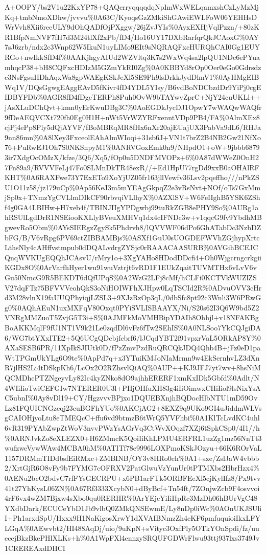\documentclass[]{article}
\begin{document}
A+OOPY/bs2V1u22KxYP78+QAQcrryqqqqdqNpImWxWELqamxshCzLyMzMjKq+tmbNmoXDhw/jvvvu\%0A63C/KyoqsGzZMkiShGAwiEWLFoW06YEHHsDWrVvh8Xii6reeULY9dOhQADfOjPXggw/26jZvJYIs\%0AyxEXHjVqlPzzn/+80zKR1BfpNmNVF7fH7d3M24tlXf2xPb/fD4/Ho16UY17DXbRarfqrQkJCAoxG\%0AY7sJ6zrb/ndx2c3Wnp62W5IkuN1uyLIMo9EIt9sNQRAQFxcHURQhCAI0Gg1EUYRGo+nwIkkSfD4f\%0AAKjhgyAIUd2WZVltq3K7s2WxWq4sa2lpQU1NDc6ePYuamhqcP38+bH8CQFxcHDIzM5GZmYkRI0Zg\%0A0KBBYd8rOp0Oer0eGo0Gdrsdzc3NsFgsuHDhAqxWa8gpWAEgKSkJeXl5SE9Ph9lsDrkkJydDlmV1\%0AyHMgEIBWq1V/DQsGgwgEAggEAvD5fKivr4fD4YDL5YIsy/B6vdBoNDCbzdDr9YiPj0cgEIDBYFDb\%0AGR8fD4fDgcTERPh8Puh0OvW9bTAYwvZprC+NjY24cuUKLl++jAsXLuDChQvt+kmn0yErKwuDBg3C\%0AoEGDkJycDJ1OpwY7wWAQwWAQfr9fDeAEQVCXt720fh0Eg0H1H+nWt5VrWZYRFxenntVDp9PB4/FA\%0AlmXEx8cjPj4ePp8Ply5dQjAYVF/fBoMBRqMR8fHx6nXr20ajEUajUX3PabVa9dL6/RHJa9nn86mn\%0A8lXey3FxceolEAhAlmWIoqi+31sb6J+VN1t7brZ2B4NB2Gw21NfXo76+PuRwEJ1Oh7S0NKSnpyM1\%0ANRVGoxEmk0n9/NHpdO1+oW+9jbbb68793ir7XdgOcOMzX/kfze/3Q6/Xq5/fOp0u5DNDFMVOPz+6\%0A87dWWeZ0OnH27Fn89a9/RVVVFeLj47Fo0SLMnDkTR48exR//+Ed1HpU77rgDd9xxB0aOHAlRFKHT\%0A6RAXFwe73Y7ExETo9XoYjUZ05fr163jllVewfv36Lsv2pqeffho///nPkZSU1O11z58/jz179uCp\%0Ap56KeJ3m5mYEAgGkpqZ2e3vRsNvt+NOf/oTs7GxMmjSp0x+TNmzYgCVLlmDIkCF90rbvqiVLlhyX\%0AZXlSV+W6FeIIghB5YSK6ZShf4g0GA4LBIHw+H7xeb4f/TBINJIIgYPDgwbj99tuRkZGB8ePHY9So\%0AURg1ahRSUlLgdDrR1NSEiooKXLlyBVeuXMHVq1dx4cIFNDc3w+v1qqcG9fv9YbdhMBgwevRo5Obm\%0AYsSIERgzZgySk5Phdrvh8/lQVVWF06dPo6GhATabDc3NzbDZbFG/B/V6vRpg6PV69ctZIBBAMBjs\%0ASXf1GuU0sUOGDEFWVhZGjhypXrtcLthsNly4cAHffvstmpub0dDQALvdrgZYSjc0rRAAACAASURB\%0AVGihBCEJCQnqWVKUgEQQhJCAsvU/rMry1o+3XgYAHo8HDodDDcfi4+Oh0WjgcrngcrkgiiKGDx8O\%0ArVarfhHyer1wu91wuVztrjt6vRD1F1EUkZqaitTUVMTHx6vLvV6vGu50NmcG9R5BEKDT6dQfUPqS\%0A2WzG2LFj8cMf/hCLFi0KCTVkWUZlZSV27dqFTz75BFVVVeohQkS3oNiHOIWFhXJHpw0LqTSCId2R\%0ADvuOVV3cHrd3M28vlnX19faUUQPhyiqjLZSL3+9XJzRzOp3qL/0dbSfc8pt92c3Wnli3W6PRwGg0\%0AQhAEuN1uxMXFqV80Oxqt0PYiSVLISBAAYX/Ni/S20s62I3Q6W9bd5Z2VNRgMMZuoT5ZvjG5T3i+S\%0AJMFkMoVMHBipYDAIh8Ohhjl+v18NFAKBgBoAKKMqlF9fU1NT1V9k21Le0zqdDl6vFz6fTw2SEhIS\%0A0NLSoo7YkCQJgiDA6/WG7btYXxITE2+5Q6UCgQDcbjfcbrf6/lJCqdYBT2f91vpxrVaL5ORkAP8Y\%0AXaSESB6PR/11XpIkSJIUtk0D/fPzZmvPzdRuQRCQkJDQ4Qhb4B+jFz0eD1paWtTPGmUkYLg6O9te\%0ApPd7q+x3YTuiKMJoNIaMrmn9w4EkSernhvLZ3dXnR7jlHS2Li4tDSkpKh6/LcOx2O2RZhsvlQiAQ\%0AUP++KJ9JFJ7yt7wv+8hsNiMQCMDhcPTZNgeyvLy82Ic4kyZNko8dO9ajhhERERF1xmKxIDk5Gbfd\%0Adlt/N4WIiIioTwiCEFGIw7NTERER0U3l+PHjOHfuXH83g4iIiOimwxCHiIiol9lsNixYsAC5ubnI\%0Ay8vDl19+CY/HgzvvvBPjxo1DQUEBXnjhBQDocHlbNTU1mD59OvLz81FQUICNGzeqj23cuBGFhYUo\%0AKCjAG2+8EXZ9q9UKo9GI4uJiddmWLVsgCAIOHjyoLtu8eTMEQcC+ffu6vd9btmzB6tWrQ5YVFhbi\%0A1KlTcLvdKC4uhl6vR319PYAbZwpZtWoV3nvvPWzYsAGrVq3CtWvXOqzf7XZj6tSpkCSp0/4I1//h\%0ARNJvkZo8eXLEZX0+H6ZMmcK5QoiIiKhLPMU4ERFRL1uzZg1mz56NnTt3wufzweVywWAw4MCBA0hM\%0ATITf78e9996LOXPmoKSkJOzyu+66K6ROrVaL1157DRMmTIDdbsfEiRMxc+ZMBINB/OY3v8HRo0eh\%0A1+sxe/ZslJaW4vbbb2/XrtGjR6O8vFy9b7FYMG7cOFRXV2PatGlwuVzYunUr0tPTMXbs2HbrHzx4\%0AENu2bcO2bdvC7rfFYsGECRPU+x6PB1arFTk5ORBFEeXl5cjKylIfz8/Px9tvv41t27YhKysL06ZN\%0A67Rf3333XcybN0+dByBcf+Tn54ft/7ZOnjwZcb9F4osvvoi4rF6vx4wZM7Bjxw4sXbo0qu0RERHR\%0ArYEjcYiIiHpRc3MzDh06hBUrVgC48YXdbDark/ECUCeYbD1Jb9vlbQ0ZMkQNSEwmE/Ly8nDp0iWc\%0AOnUKJSUliI+Ph1arxdSpU/Hxxx9H1NaKigosXrwY1dXVAIBNmzZh4cKF6pmfuquioiIkxLFYLGqA\%0AEwvbt2/HI488AqDj/uio/9uKpN+sVityc3OxfPly5OTkYOnSpdi/fz/uuecejBkzBkePHlXLKs+h\%0A1WpFXl4ennzySRQUFGDWrFlwu93ttj937lxs3749Jv1CREREAxdDHCI
\end{document}
